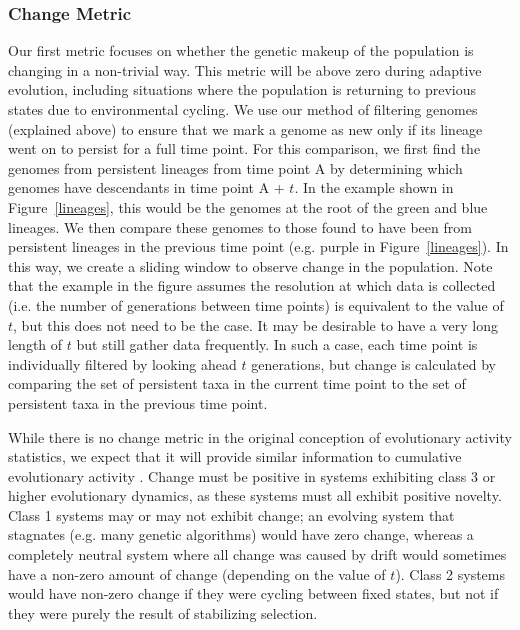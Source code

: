 \documentclass[letterpaper]{article}
\begin{document}
\subsubsection{Change Metric}
Our first metric focuses on whether the genetic makeup of the population is changing in a non-trivial way. This metric will be above zero %
during adaptive evolution, including situations where the population is returning to previous states due to environmental cycling.
We use our method of filtering genomes (explained above) to ensure that we mark a genome as new %
only if its lineage 
went on to persist for a
full time point. For this comparison, we first find the genomes from persistent lineages from time point A by determining which genomes have descendants in time point A + $t$. In the example shown in Figure~\ref{lineages}, this would be the genomes at the root of the green and blue lineages. We then compare these genomes to those found to have been from persistent lineages in the previous time point (e.g. purple in Figure~\ref{lineages}). In this way, we create a sliding window to observe change in the population. Note that the example in the figure assumes the resolution at which data is collected (i.e. the number of generations between time points) is equivalent to the value of $t$, but this does not need to be the case. It may be desirable to have a very long length of $t$ but still gather data frequently. In such a case, each time point is individually filtered by looking ahead $t$ generations, but change is calculated by comparing the set of persistent taxa in the current time point to the set of persistent taxa in the previous time point. 

While there is no change metric in the original conception of evolutionary activity statistics, we expect that it will provide similar information to cumulative evolutionary activity \citep{bedau_comparison_1997}. Change must be positive in systems exhibiting class 3 or higher evolutionary dynamics, as these systems must all exhibit positive novelty. Class 1 systems may or may not exhibit change; an evolving system that stagnates (e.g. many genetic algorithms) would have zero change, whereas a completely neutral system where all change was caused by drift would sometimes have a non-zero amount of change (depending on the value of $t$). Class 2 systems would have non-zero change if they were cycling between fixed states, but not if they were purely the result of stabilizing selection.
\end{document}
